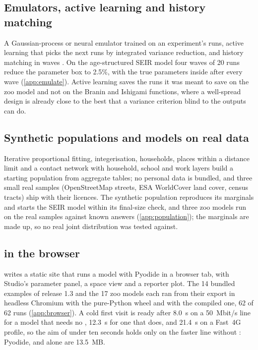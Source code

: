 \subsection{Emulators, active learning and history matching}
\label{sec:emulate}

A Gaussian-process or neural emulator trained on an experiment's runs, active learning that
picks the next runs by integrated variance reduction, and history matching in waves
\citep{vernon2010galaxy, andrianakis2015bayesian}. On the age-structured SEIR model four waves
of 20 runs reduce the parameter box to 2.5\%, with the true parameters inside after every wave
(\cref{app:emulate}). Active learning saves the runs it was meant to save on the zoo model and
not on the Branin and Ishigami functions, where a well-spread design is already close to the
best that a variance criterion blind to the outputs can do.

\subsection{Synthetic populations and models on real data}
\label{sec:population}

Iterative proportional fitting, integerisation, households, places within a distance limit and
a contact network with household, school and work layers build a starting population from
aggregate tables; no personal data is bundled, and three small real samples (OpenStreetMap
streets, ESA WorldCover land cover, census tracts) ship with their licences. The synthetic
population reproduces its marginals and starts the SEIR model within its final-size check, and
three zoo models run on the real samples against known answers (\cref{app:population}); the
marginals are made up, so no real joint distribution was tested against.

\subsection{\modelly{} in the browser}
\label{sec:browser}

 writes a static site that runs a model with Pyodide in a browser tab,
with Studio's parameter panel, a space view and a reporter plot. The 14 bundled examples of
release 1.3 and the 17 zoo models each ran from their export in headless Chromium with the
pure-Python wheel and with the compiled one, 62 of 62 runs (\cref{app:browser}). A cold first
visit is ready after 8.0~s on a 50~Mbit/s line for a model that needs no , 12.3~s
for one that does, and 21.4~s on a Fast~4G profile, so the aim of under ten seconds holds only
on the faster line without : Pyodide,  and  alone are
13.5~MB.
